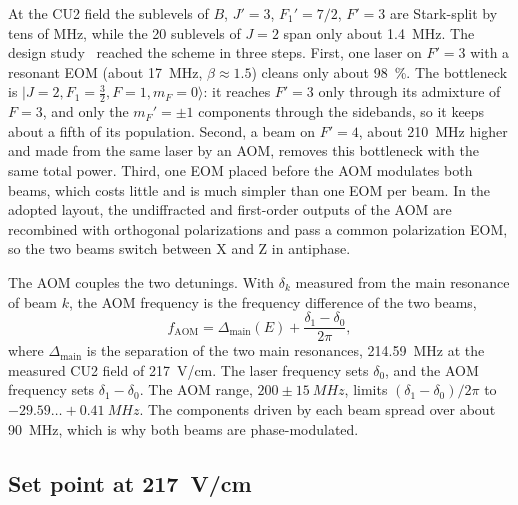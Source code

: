 \documentclass[11pt,a4paper,oneside]{report}
\newcommand{\fAOM}{f_{\mathrm{AOM}}}
\newcommand{\Dmain}{\Delta_{\mathrm{main}}}
\begin{document}
At the CU2 field the sublevels of $B$, $J'=3$, $F_1'=7/2$, $F'=3$ are Stark-split by tens of MHz,
while the 20 sublevels of $J=2$ span only about \SI{1.4}{MHz}. The design
study~\cite{CleanupTheory2024} reached the scheme in three steps. First, one laser on $F'=3$ with a
resonant EOM (about \SI{17}{MHz}, $\beta\approx1.5$) cleans only about \SI{98}{\percent}. The
bottleneck is $|J=2,F_1=\tfrac32,F=1,m_F=0\rangle$: it reaches $F'=3$ only through its admixture of
$F=3$, and only the $m_F'=\pm1$ components through the sidebands, so it keeps about a fifth of its
population. Second, a beam on $F'=4$, about \SI{210}{MHz} higher and made from the same laser by an
AOM, removes this bottleneck with the same total power. Third, one EOM placed before the AOM
modulates both beams, which costs little and is much simpler than one EOM per beam. In the adopted
layout, the undiffracted and first-order outputs of the AOM are recombined with orthogonal
polarizations and pass a common polarization EOM, so the two beams switch between X and Z in
antiphase.

The AOM couples the two detunings. With $\delta_k$ measured from the main resonance of beam $k$,
the AOM frequency is the frequency difference of the two beams,
\begin{equation}
  \fAOM=\Dmain(E)+\frac{\delta_1-\delta_0}{2\pi},
  \label{eq:aom}
\end{equation}
where $\Dmain$ is the separation of the two main resonances, \SI{214.59}{MHz} at the measured CU2 field of
\SI{217}{V/cm}. The laser frequency sets $\delta_0$, and the AOM frequency sets $\delta_1-\delta_0$.
The AOM range, $200\pm\SI{15}{MHz}$, limits $(\delta_1-\delta_0)/2\pi$ to
$-29.59\ldots+\SI{0.41}{MHz}$. The components driven by each beam spread over about \SI{90}{MHz},
which is why both beams are phase-modulated.

\subsection{Set point at \SI{217}{V/cm}}
\label{sec:cu2_opt}
\end{document}
